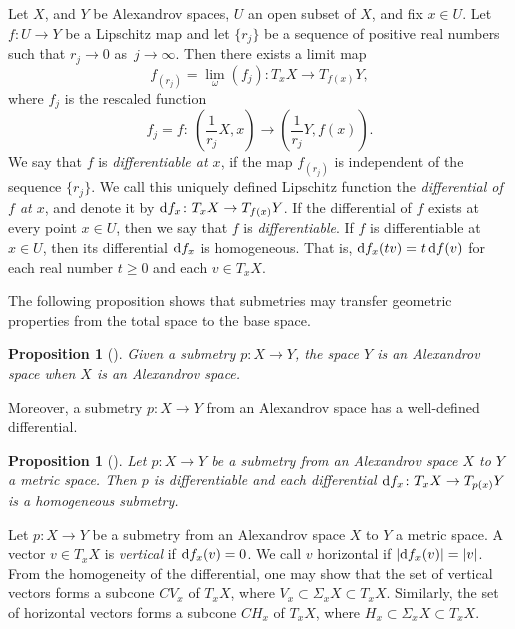 \documentclass[10pt,a4paper]{amsart}
\numberwithin{equation}{section}
\newtheorem{prop}[thm]{Proposition}
\theoremstyle{definition}
\begin{document}
Let $X$, and $Y$ be Alexandrov spaces, $U$ an open subset of $X$, and fix $x\in U$. Let $f\colon U\to Y$ be a Lipschitz map and let
$\{r_j\}$ be a sequence of positive real numbers such that $r_j\to 0$ as~${j\to\infty}$.
Then there exists a limit map
\[
f_{(r_j)} = \lim_\omega (f_j)\colon T_xX \to T_{f(x)}Y,
\]
where $f_j$ is the rescaled function
\[
f_j=f\colon\ \left(\frac{1}{r_j}X,x\right)\to \left(\frac{1}{r_j}Y,f(x)\right).
\]
We say that $f$ is \emph{differentiable at $x$}, if the map $f_{(r_j)}$ is independent of the sequence $\{r_j\}$. We call this uniquely defined Lipschitz function the \emph{differential of $f$ at $x$}, and denote it by ${\rm d}f_x\colon T_xX \to T_{f(x)}Y$. If the differential of $f$ exists at every point $x\in U$, then we say that $f$ is \emph{differentiable}. If $f$ is differentiable at $x\in U$, then its differential ${\rm d}f_x$ is homogeneous. That is, ${\rm d}f_x(tv) = t\,{\rm d}f(v)$ for each real number $t\geq 0$ and each $v\in T_xX$.


The following proposition shows that submetries may transfer geometric properties from the total space to the base space.



\begin{prop}[]
\label{P: if X alex then Y alex}
Given a submetry $p\colon X\to Y$, the space $Y$ is an Alexandrov space when $X$ is an Alexandrov space.
\end{prop}
	
Moreover, a submetry $p\colon X\to Y$ from an Alexandrov space has a well-defined differential.

\begin{prop}[]
Let $p\colon X\to Y$ be a submetry from an Alexandrov space $X$ to $Y$ a metric space. Then $p$ is differentiable and each differential ${\rm d}f_x\colon T_x X\to T_{p(x)} Y$ is a homogeneous submetry.
\end{prop}

Let $p\colon X\to Y$ be a submetry from an Alexandrov space $X$ to $Y$ a metric space. A vector $v\in T_xX$ is \emph{vertical} if ${\rm d}f_x(v)=0$. We call $v$ horizontal if $|{\rm d}f_x(v)|=|v|$. From the homogeneity of the differential, one may show that the set of vertical vectors forms a subcone $CV_x$ of $T_xX$, where $V_x\subset \Sigma_xX\subset T_xX$. Similarly, the set of horizontal vectors forms a subcone $CH_x$ of $T_xX$, where $H_x\subset \Sigma_xX\subset T_xX$.
\end{document}
